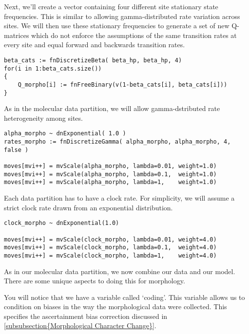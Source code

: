 Next, we'll create a vector containing four different site stationary state frequencies. 
This is similar to allowing gamma-distributed rate variation across sites. 
We will then use these stationary frequencies to generate a set of new Q-matrices which do not enforce the assumptions of the same transition rates at every site and equal forward and backwards transition rates.

{\tt \begin{snugshade*}
\begin{lstlisting}
beta_cats := fnDiscretizeBeta( beta_hp, beta_hp, 4)
for(i in 1:beta_cats.size())
{
    Q_morpho[i] := fnFreeBinary(v(1-beta_cats[i], beta_cats[i]))
}
\end{lstlisting}
\end{snugshade*}}


As in the molecular data partition, we will allow gamma-dstributed rate heterogeneity among sites.
{\tt \begin{snugshade*}
\begin{lstlisting}
alpha_morpho ~ dnExponential( 1.0 )
rates_morpho := fnDiscretizeGamma( alpha_morpho, alpha_morpho, 4, false )

moves[mvi++] = mvScale(alpha_morpho, lambda=0.01, weight=1.0)
moves[mvi++] = mvScale(alpha_morpho, lambda=0.1,  weight=1.0)
moves[mvi++] = mvScale(alpha_morpho, lambda=1,    weight=1.0)
\end{lstlisting}
\end{snugshade*}}

Each data partition has to have a clock rate. For simplicity, we will assume a strict clock rate drawn from an exponential distribution.

{\tt \begin{snugshade*}
\begin{lstlisting}
clock_morpho ~ dnExponential(1.0)

moves[mvi++] = mvScale(clock_morpho, lambda=0.01, weight=4.0)
moves[mvi++] = mvScale(clock_morpho, lambda=0.1,  weight=4.0)
moves[mvi++] = mvScale(clock_morpho, lambda=1,    weight=4.0)
\end{lstlisting}
\end{snugshade*}}

As in our molecular data partition, we now combine our data and our model. There are some unique aspects to doing this for morphology. \par
You will notice that we have a variable called `coding'. This variable allows us to condition on biases in the way the morphological data were collected.
This specifies the ascertainment bias correction discussed in \ref{subsubsection{Morphological Character Change}}. \par

